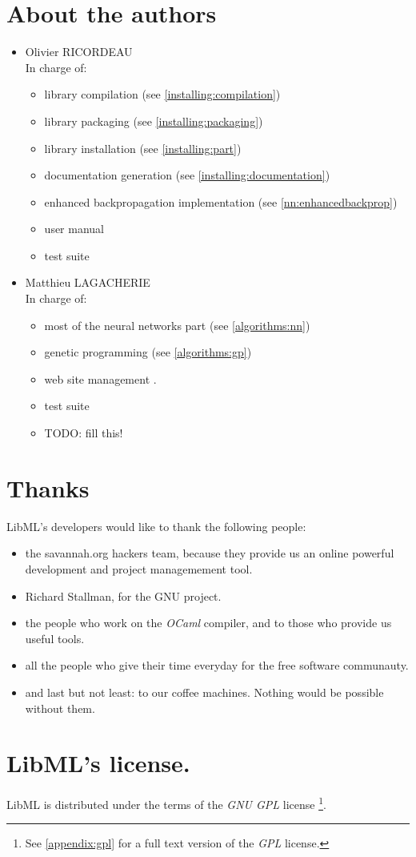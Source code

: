 \section{About the authors}
\begin{itemize}

\item Olivier RICORDEAU\\
In charge of:
\begin{itemize}
\item library compilation (see \vref{installing:compilation})
\item library packaging (see \vref{installing:packaging})
\item library installation (see \vref{installing:part})
\item documentation generation (see \vref{installing:documentation})
\item enhanced backpropagation implementation (see
\vref{nn:enhancedbackprop})
\item user manual
\item test suite
\end{itemize} 

\item Matthieu LAGACHERIE\\
In charge of:
\begin{itemize}
\item most of the neural networks part (see \vref{algorithms:nn})
\item genetic programming (see \vref{algorithms:gp})
\item web site management \cite{libml:web}.
\item test suite
\item TODO: fill this!
\end{itemize} 

\end{itemize}
 
\newpage
\section{Thanks}
LibML's developers would like to thank the following people:

\begin{itemize}
\item the savannah.org hackers team, because they provide us an online
powerful development and project managemement tool.
\item Richard Stallman, for the GNU project.
\item the people who work on the \textit{OCaml} compiler, and to those who
provide us useful tools.
\item all the people who give their time everyday for the free software
communauty.
\item and last but not least: to our coffee machines. Nothing would be
possible without them.
\end{itemize}

\newpage
\section{LibML's license.}
LibML is distributed under the terms of the \textit{GNU GPL} license
\footnote{See \vref{appendix:gpl} for a full text version of the \textit{GPL}
license.}.

